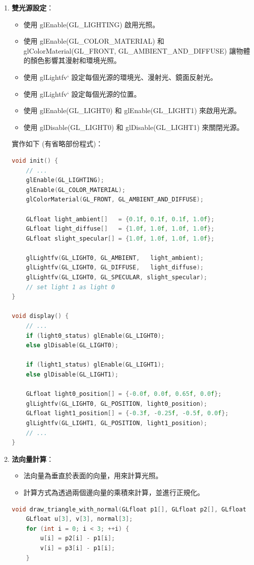 \documentclass[12pt,a4paper]{article}
\begin{document}
\begin{enumerate}
  \item \textbf{雙光源設定}：
    \begin{itemize}
        \item 使用 glEnable(GL\_LIGHTING) 啟用光照。
        \item 使用 glEnable(GL\_COLOR\_MATERIAL) 和 glColorMaterial(GL\_FRONT, GL\_AMBIENT\_AND\_DIFFUSE) 讓物體的顏色影響其漫射和環境光照。
        \item 使用 glLightfv` 設定每個光源的環境光、漫射光、鏡面反射光。
        \item 使用 glLightfv` 設定每個光源的位置。
        \item 使用 glEnable(GL\_LIGHT0) 和 glEnable(GL\_LIGHT1) 來啟用光源。
        \item 使用 glDisable(GL\_LIGHT0) 和 glDisable(GL\_LIGHT1) 來關閉光源。
    \end{itemize}
    
    實作如下 (有省略部份程式)：
\begin{lstlisting}[language=C++,breaklines=true]
void init() {
    // ...
    glEnable(GL_LIGHTING);
    glEnable(GL_COLOR_MATERIAL);
    glColorMaterial(GL_FRONT, GL_AMBIENT_AND_DIFFUSE);

    GLfloat light_ambient[]   = {0.1f, 0.1f, 0.1f, 1.0f}; 
    GLfloat light_diffuse[]   = {1.0f, 1.0f, 1.0f, 1.0f};
    GLfloat slight_specular[] = {1.0f, 1.0f, 1.0f, 1.0f};

    glLightfv(GL_LIGHT0, GL_AMBIENT,   light_ambient);
    glLightfv(GL_LIGHT0, GL_DIFFUSE,   light_diffuse);
    glLightfv(GL_LIGHT0, GL_SPECULAR, slight_specular);
    // set light 1 as light 0
}

void display() {
    // ...
    if (light0_status) glEnable(GL_LIGHT0);
    else glDisable(GL_LIGHT0);

    if (light1_status) glEnable(GL_LIGHT1);
    else glDisable(GL_LIGHT1);

    GLfloat light0_position[] = {-0.0f, 0.0f, 0.65f, 0.0f};
    glLightfv(GL_LIGHT0, GL_POSITION, light0_position);
    GLfloat light1_position[] = {-0.3f, -0.25f, -0.5f, 0.0f};
    glLightfv(GL_LIGHT1, GL_POSITION, light1_position);
    // ...
}
\end{lstlisting}
\newpage
\item \textbf{法向量計算}：
    \begin{itemize}
      \item 法向量為垂直於表面的向量，用來計算光照。
      \item 計算方式為透過兩個邊向量的乘積來計算，並進行正規化。
    \end{itemize}
    \begin{lstlisting}[language=C++,breaklines=true]
void draw_triangle_with_normal(GLfloat p1[], GLfloat p2[], GLfloat p3[]) {
    GLfloat u[3], v[3], normal[3];
    for (int i = 0; i < 3; ++i) {
        u[i] = p2[i] - p1[i];
        v[i] = p3[i] - p1[i];
    }


\end{lstlisting}
\end{enumerate}
\end{document}

